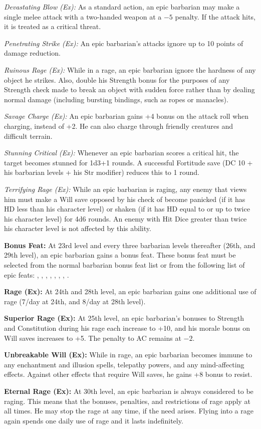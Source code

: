 \textit{Devastating Blow (Ex):} As a standard action, an epic barbarian may make a single melee attack with a two-handed weapon at a $-5$ penalty. If the attack hits, it is treated as a critical threat.

\textit{Penetrating Strike (Ex):} An epic barbarian's attacks ignore up to 10 points of damage reduction.

\textit{Ruinous Rage (Ex):} While in a rage, an epic barbarian ignore the hardness of any object he strikes. Also, double his Strength bonus for the purposes of any Strength check made to break an object with sudden force rather than by dealing normal damage (including bursting bindings, such as ropes or manacles).

\textit{Savage Charge (Ex):} An epic barbarian gains +4 bonus on the attack roll when charging, instead of +2. He can also charge through friendly creatures and difficult terrain.

\textit{Stunning Critical (Ex):} Whenever an epic barbarian scores a critical hit, the target becomes stunned for 1d3+1 rounds. A successful Fortitude save (DC 10 + \onehalf his barbarian levels + his Str modifier) reduces this to 1 round.

\textit{Terrifying Rage (Ex):} While an epic barbarian is raging, any enemy that views him must make a Will save opposed by his  check of become panicked (if it has HD less than his character level) or shaken (if it has HD equal to or up to twice his character level) for 4d6 rounds. An enemy with Hit Dice greater than twice his character level is not affected by this ability.


\textbf{Bonus Feat:} At 23rd level and every three barbarian levels thereafter (26th, and 29th level), an epic barbarian gains a bonus feat. These bonus feat must be selected from the normal barbarian bonus feat list or from the following list of epic feats:
,
,
,
,
,
,
,
.

\textbf{Rage (Ex):} At 24th and 28th level, an epic barbarian gains one additional use of rage (7/day at 24th, and 8/day at 28th level).

\textbf{Superior Rage (Ex):} At 25th level, an epic barbarian's bonuses to Strength and Constitution during his rage each increase to +10, and his morale bonus on Will saves increases to +5. The penalty to AC remains at $-2$.

\textbf{Unbreakable Will (Ex):} While in rage, an epic barbarian becomes immune to any enchantment and illusion spells, telepathy powers, and any mind-affecting effects. Against other effects that require Will saves, he gains +8 bonus to resist.

\textbf{Eternal Rage (Ex):} At 30th level, an epic barbarian is always considered to be raging. This means that the bonuses, penalties, and restrictions of rage apply at all times. He may stop the rage at any time, if the need arises. Flying into a rage again spends one daily use of rage and it lasts indefinitely.
